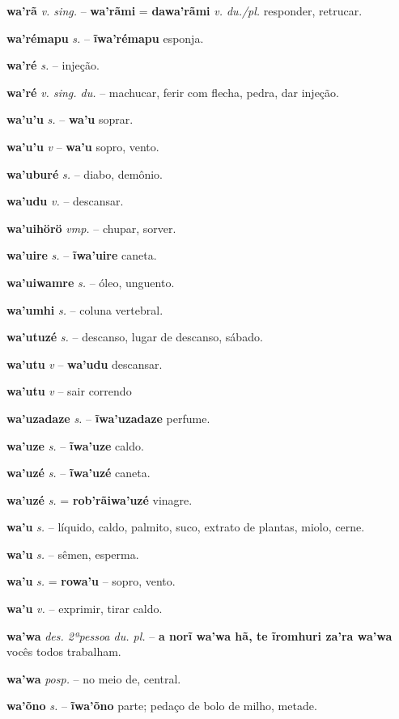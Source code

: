 \textbf{wa'rã} \textit{v. sing.} -- \textbf{wa'rãmi} = \textbf{dawa'rãmi} \textit{v. du./pl.} responder, retrucar.

\textbf{wa'rémapu} \textit{s.} -- \textbf{ĩwa'rémapu} esponja.

\textbf{wa'ré} \textit{s.} -- injeção.

\textbf{wa'ré} \textit{v. sing. du.} -- machucar, ferir com flecha, pedra, dar injeção.

\textbf{wa'u'u} \textit{s.} -- \textbf{wa'u} soprar.

\textbf{wa'u'u} \textit{v} -- \textbf{wa'u} sopro, vento.

\textbf{wa'uburé} \textit{s.} -- diabo, demônio.

\textbf{wa'udu} \textit{v.} -- descansar.

\textbf{wa'uihörö} \textit{vmp.} -- chupar, sorver.

\textbf{wa'uire} \textit{s.} -- \textbf{ĩwa'uire} caneta.

\textbf{wa'uiwamre} \textit{s.} -- óleo, unguento.

\textbf{wa'umhi} \textit{s.} -- coluna vertebral.

\textbf{wa'utuzé} \textit{s.} -- descanso, lugar de descanso, sábado.

\textbf{wa'utu} \textit{v} -- \textbf{wa'udu} descansar.

\textbf{wa'utu} \textit{v} -- {sair correndo}

\textbf{wa'uzadaze} \textit{s.} -- \textbf{ĩwa'uzadaze} perfume.

\textbf{wa'uze} \textit{s.} -- \textbf{ĩwa'uze} caldo.

\textbf{wa'uzé} \textit{s.} -- \textbf{ĩwa'uzé} caneta.

\textbf{wa'uzé} \textit{s.} = \textbf{rob'rãiwa'uzé} vinagre.

\textbf{wa'u} \textit{s.} -- líquido, caldo, palmito, suco, extrato de plantas, miolo, cerne.

\textbf{wa'u} \textit{s.} -- sêmen, esperma.

\textbf{wa'u} \textit{s.} = \textbf{rowa'u} -- sopro, vento.

\textbf{wa'u} \textit{v.} -- exprimir, tirar caldo.

\textbf{wa'wa} \textit{des. 2ªpessoa du. pl.} -- \textbf{a norĩ wa'wa hã, te ĩromhuri za'ra wa'wa} vocês todos trabalham.

\textbf{wa'wa} \textit{posp.} -- no meio de, central.

\textbf{wa'õno} \textit{s.} -- \textbf{ĩwa'õno} parte; pedaço de bolo de milho, metade.

